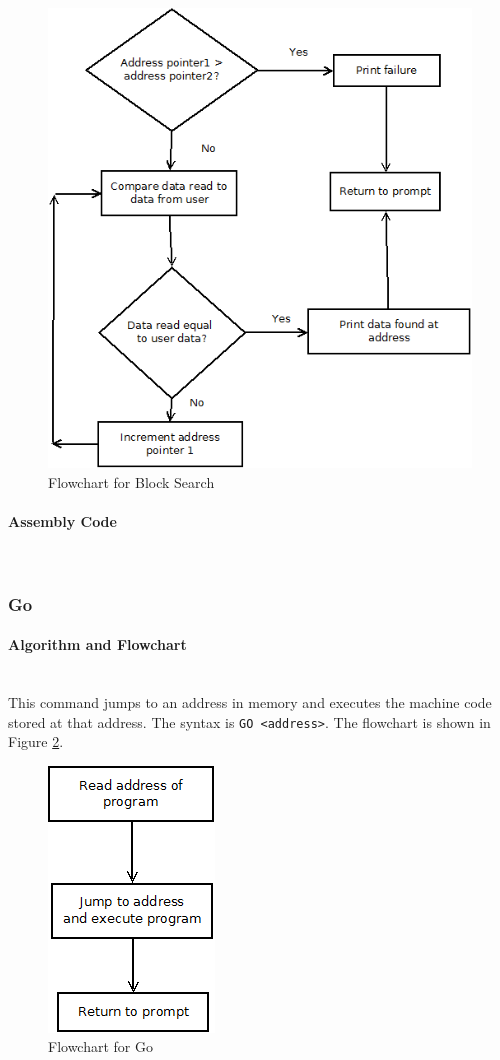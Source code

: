 \documentclass[12pt]{article}
\begin{document}
\begin{figure}[H]
\centering
\includegraphics[width=0.7\linewidth]{BSearch}
\caption{Flowchart for Block Search}
\label{fig:BSearch}
\end{figure}
			\paragraph{Assembly Code}~\\				%
			
			\subsubsection{Go}
			
			\paragraph{Algorithm and Flowchart}~\\
			This command jumps to an address in memory and executes the machine code stored at that address. The syntax is \texttt{GO <address>}. The flowchart is shown in Figure \ref{fig:Go}.
			
			
\begin{figure}[H]
\centering
\includegraphics[width=0.2\linewidth]{Go}
\caption{Flowchart for Go}
\label{fig:Go}
\end{figure}
\end{document}
